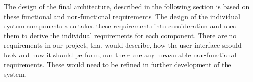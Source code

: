 The design of the final architecture, described in the following section is based on these functional and non-functional requirements. The design of the individual system components also takes these requirements into consideration and uses them to derive the individual requirements for each component. There are no requirements in our project, that would describe, how the user interface should look and how it should perform, nor there are any measurable non-functional requirements. These would need to be refined in further development of the system.
